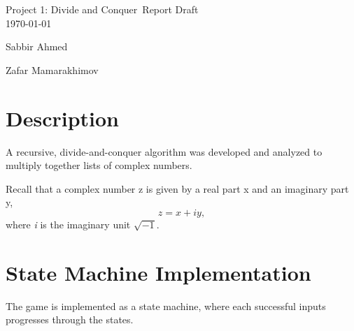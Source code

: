 \documentclass[usletter, 12pt]{article}
\newcommand{\project}{Project 1: Divide and Conquer}
\newcommand{\Sabbir}{Sabbir Ahmed}
\newcommand{\Zafar}{Zafar Mamarakhimov}
\begin{document}

    \begin{titlepage}

        \vspace*{\fill} %
        \begin{center}

            {\LARGE \project~Report Draft}\\ [1.5cm]

            \today
            
            \vspace*{\fill}

            \Sabbir

            \Zafar

        \end{center}
        \vspace*{\fill} %

    \end{titlepage}

    \section{Description}

        A recursive, divide-and-conquer algorithm was developed and analyzed to multiply together lists of complex numbers.

        Recall that a complex number z is given by a real part x and an imaginary part y,
            \[ z=x+iy, \]
        where \textit{i} is the imaginary unit $\sqrt{-1}$.

    \section{State Machine Implementation}

        The game is implemented as a state machine, where each successful inputs progresses through the states.

\end{document}
